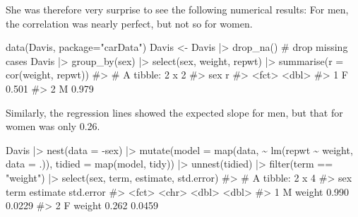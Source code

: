 \documentclass[
  letterpaper,
  10pt,
  krantz2]{krantz}
\makeatletter
\newenvironment{Shaded}{\begin{snugshade}}{\end{snugshade}}
\newcommand{\AttributeTok}[1]{\textcolor[rgb]{0.40,0.45,0.13}{#1}}
\newcommand{\CommentTok}[1]{\textcolor[rgb]{0.37,0.37,0.37}{#1}}
\newcommand{\FunctionTok}[1]{\textcolor[rgb]{0.28,0.35,0.67}{#1}}
\newcommand{\NormalTok}[1]{\textcolor[rgb]{0.00,0.23,0.31}{#1}}
\newcommand{\OtherTok}[1]{\textcolor[rgb]{0.00,0.23,0.31}{#1}}
\newcommand{\SpecialCharTok}[1]{\textcolor[rgb]{0.37,0.37,0.37}{#1}}
\newcommand{\StringTok}[1]{\textcolor[rgb]{0.13,0.47,0.30}{#1}}
\newenvironment{kframe}{%
  \medskip{}
  \setlength{\fboxsep}{.8em}
  \def\at@end@of@kframe{}%
  \ifinner\ifhmode%
  \def\at@end@of@kframe{\end{minipage}}%
  \begin{minipage}{\columnwidth}%
  \fi\fi%
  \def\FrameCommand##1{\hskip\@totalleftmargin \hskip-\fboxsep
  \colorbox{shadecolor}{##1}\hskip-\fboxsep
      \hskip-\linewidth \hskip-\@totalleftmargin \hskip\columnwidth}%
  \MakeFramed {\advance\hsize-\width
    \@totalleftmargin\z@ \linewidth\hsize
    \@setminipage}}%
{\par\unskip\endMakeFramed%
  \at@end@of@kframe}
\renewenvironment{Shaded}{\begin{kframe}}{\end{kframe}}
\makeatother
\begin{document}
She was therefore very surprise to see the following numerical results:
For men, the correlation was nearly perfect, but not so for women.

\begin{Shaded}
\begin{Highlighting}[]
\FunctionTok{data}\NormalTok{(Davis, }\AttributeTok{package=}\StringTok{"carData"}\NormalTok{)}
\NormalTok{Davis }\OtherTok{\textless{}{-}}\NormalTok{ Davis }\SpecialCharTok{|\textgreater{}}
  \FunctionTok{drop\_na}\NormalTok{()          }\CommentTok{\# drop missing cases}
\NormalTok{Davis }\SpecialCharTok{|\textgreater{}}
  \FunctionTok{group\_by}\NormalTok{(sex) }\SpecialCharTok{|\textgreater{}}
  \FunctionTok{select}\NormalTok{(sex, weight, repwt) }\SpecialCharTok{|\textgreater{}}
  \FunctionTok{summarise}\NormalTok{(}\AttributeTok{r =} \FunctionTok{cor}\NormalTok{(weight, repwt))}
\CommentTok{\#\textgreater{} \# A tibble: 2 x 2}
\CommentTok{\#\textgreater{}   sex       r}
\CommentTok{\#\textgreater{}   \textless{}fct\textgreater{} \textless{}dbl\textgreater{}}
\CommentTok{\#\textgreater{} 1 F     0.501}
\CommentTok{\#\textgreater{} 2 M     0.979}
\end{Highlighting}
\end{Shaded}

Similarly, the regression lines showed the expected slope for men, but
that for women was only 0.26.

\begin{Shaded}
\begin{Highlighting}[]
\NormalTok{Davis }\SpecialCharTok{|\textgreater{}}
  \FunctionTok{nest}\NormalTok{(}\AttributeTok{data =} \SpecialCharTok{{-}}\NormalTok{sex) }\SpecialCharTok{|\textgreater{}}
  \FunctionTok{mutate}\NormalTok{(}\AttributeTok{model =} \FunctionTok{map}\NormalTok{(data, }\SpecialCharTok{\textasciitilde{}} \FunctionTok{lm}\NormalTok{(repwt }\SpecialCharTok{\textasciitilde{}}\NormalTok{ weight, }\AttributeTok{data =}\NormalTok{ .)),}
         \AttributeTok{tidied =} \FunctionTok{map}\NormalTok{(model, tidy)) }\SpecialCharTok{|\textgreater{}}
  \FunctionTok{unnest}\NormalTok{(tidied) }\SpecialCharTok{|\textgreater{}}
  \FunctionTok{filter}\NormalTok{(term }\SpecialCharTok{==} \StringTok{"weight"}\NormalTok{) }\SpecialCharTok{|\textgreater{}}
  \FunctionTok{select}\NormalTok{(sex, term, estimate, std.error)}
\CommentTok{\#\textgreater{} \# A tibble: 2 x 4}
\CommentTok{\#\textgreater{}   sex   term   estimate std.error}
\CommentTok{\#\textgreater{}   \textless{}fct\textgreater{} \textless{}chr\textgreater{}     \textless{}dbl\textgreater{}     \textless{}dbl\textgreater{}}
\CommentTok{\#\textgreater{} 1 M     weight    0.990    0.0229}
\CommentTok{\#\textgreater{} 2 F     weight    0.262    0.0459}
\end{Highlighting}
\end{Shaded}
\end{document}
